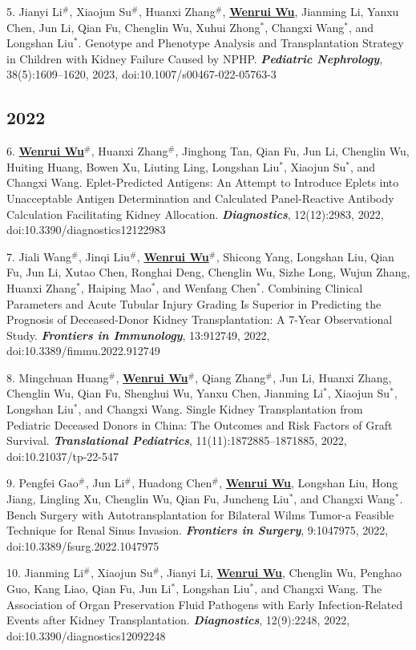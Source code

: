 \documentclass{article}
\begin{document}
5. Jianyi Li$^{\#}$, Xiaojun Su$^{\#}$, Huanxi Zhang$^{\#}$, \underline{\textbf{Wenrui Wu}}, Jianming Li, Yanxu Chen, Jun Li, Qian Fu, Chenglin Wu, Xuhui Zhong$^{*}$, Changxi Wang$^{*}$, and Longshan Liu$^{*}$. Genotype and Phenotype Analysis and Transplantation Strategy in Children with Kidney Failure Caused by NPHP. \textbf{\textit{Pediatric Nephrology}}, 38(5):1609–1620, 2023, doi:10.1007/s00467-022-05763-3

\subsection*{2022}

6. \underline{\textbf{Wenrui Wu}}$^{\#}$, Huanxi Zhang$^{\#}$, Jinghong Tan, Qian Fu, Jun Li, Chenglin Wu, Huiting Huang, Bowen Xu, Liuting Ling, Longshan Liu$^{*}$, Xiaojun Su$^{*}$, and Changxi Wang. Eplet-Predicted Antigens: An Attempt to Introduce Eplets into Unacceptable Antigen Determination and Calculated Panel-Reactive Antibody Calculation Facilitating Kidney Allocation. \textbf{\textit{Diagnostics}}, 12(12):2983, 2022, doi:10.3390/diagnostics12122983

7. Jiali Wang$^{\#}$, Jinqi Liu$^{\#}$, \underline{\textbf{Wenrui Wu}}$^{\#}$, Shicong Yang, Longshan Liu, Qian Fu, Jun Li, Xutao Chen, Ronghai Deng, Chenglin Wu, Sizhe Long, Wujun Zhang, Huanxi Zhang$^{*}$, Haiping Mao$^{*}$, and Wenfang Chen$^{*}$. Combining Clinical Parameters and Acute Tubular Injury Grading Is Superior in Predicting the Prognosis of Deceased-Donor Kidney Transplantation: A 7-Year Observational Study. \textbf{\textit{Frontiers in Immunology}}, 13:912749, 2022, doi:10.3389/fimmu.2022.912749

8. Mingchuan Huang$^{\#}$, \underline{\textbf{Wenrui Wu}}$^{\#}$, Qiang Zhang$^{\#}$, Jun Li, Huanxi Zhang, Chenglin Wu, Qian Fu, Shenghui Wu, Yanxu Chen, Jianming Li$^{*}$, Xiaojun Su$^{*}$, Longshan Liu$^{*}$, and Changxi Wang. Single Kidney Transplantation from Pediatric Deceased Donors in China: The Outcomes and Risk Factors of Graft Survival. \textbf{\textit{Translational Pediatrics}}, 11(11):1872885–1871885, 2022, doi:10.21037/tp-22-547

9. Pengfei Gao$^{\#}$, Jun Li$^{\#}$, Huadong Chen$^{\#}$, \underline{\textbf{Wenrui Wu}}, Longshan Liu, Hong Jiang, Lingling Xu, Chenglin Wu, Qian Fu, Juncheng Liu$^{*}$, and Changxi Wang$^{*}$. Bench Surgery with Autotransplantation for Bilateral Wilms Tumor-a Feasible Technique for Renal Sinus Invasion. \textbf{\textit{Frontiers in Surgery}}, 9:1047975, 2022, doi:10.3389/fsurg.2022.1047975

10. Jianming Li$^{\#}$, Xiaojun Su$^{\#}$, Jianyi Li, \underline{\textbf{Wenrui Wu}}, Chenglin Wu, Penghao Guo, Kang Liao, Qian Fu, Jun Li$^{*}$, Longshan Liu$^{*}$, and Changxi Wang. The Association of Organ Preservation Fluid Pathogens with Early Infection-Related Events after Kidney Transplantation. \textbf{\textit{Diagnostics}}, 12(9):2248, 2022, doi:10.3390/diagnostics12092248
\end{document}
